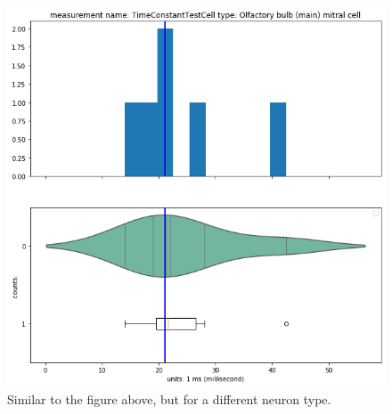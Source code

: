 \begin{figure}
\begin{center}
\includegraphics[scale=0.8]{chapters/notebooks_converted/needata_thesis_files/needata_thesis_5_23}
\caption{Similar to the figure above, but for a different neuron type.}
\label{fig:uniform-feature2}
\end{center}
\end{figure}

